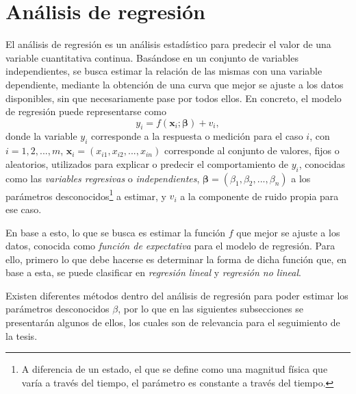 \section{Análisis de regresión}
\label{sec:regressionanalysis}
El análisis de regresión es un análisis estadístico para predecir el valor de una variable cuantitativa continua. Basándose en un conjunto de variables independientes, se busca estimar la relación de las mismas con una variable dependiente, mediante la obtención de una curva que mejor se ajuste a los datos disponibles, sin que necesariamente pase por todos ellos. En concreto, el modelo de regresión puede representarse como
\begin{equation}
    y_i = f(\bm{x}_i; \bm{\beta}) + v_i,
    \label{eq:regressionmodel}
\end{equation}
donde la variable $y_i$ corresponde a la respuesta o medición para el caso $i$, con $i = 1, 2, ..., m$, $\bm{x}_i = (x_{i1}, x_{i2}, ..., x_{in})$ corresponde al conjunto de valores, fijos o aleatorios, utilizados para explicar o predecir el comportamiento de $y_i$, conocidas como las \textit{variables regresivas} o \textit{independientes}, $\bm{\beta} = (\beta_1, \beta_2, ..., \beta_n)$ a los parámetros desconocidos\footnote{A diferencia de un estado, el que se define como una magnitud física que varía a través del tiempo, el parámetro es constante a través del tiempo.} a estimar, y $v_i$ a la componente de ruido propia para ese caso.

En base a esto, lo que se busca es estimar la función $f$ que mejor se ajuste a los datos, conocida como \textit{función de expectativa} para el modelo de regresión. Para ello, primero lo que debe hacerse es determinar la forma de dicha función que, en base a esta, se puede clasificar en \textit{regresión lineal} y \textit{regresión no lineal}.

Existen diferentes métodos dentro del análisis de regresión para poder estimar los parámetros desconocidos $\beta$, por lo que en las siguientes subsecciones se presentarán algunos de ellos, los cuales son de relevancia para el seguimiento de la tesis.




